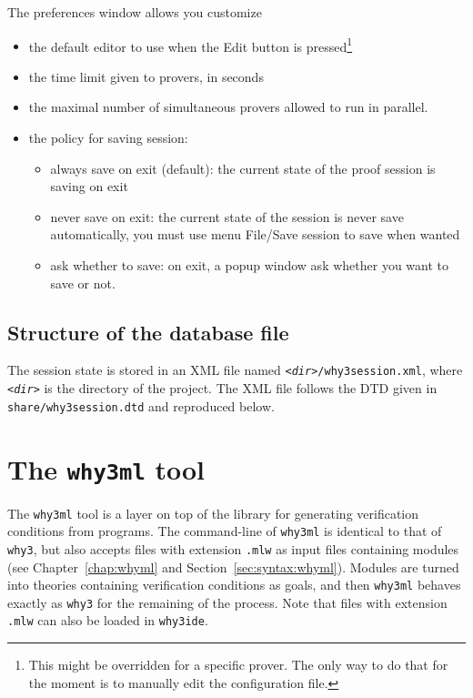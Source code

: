 The preferences window allows you customize
\begin{itemize}
\item the default editor to use when the \textsf{Edit} button is
  pressed\footnote{This might be overridden for a specific prover. The only way
  to do that for the moment is to manually edit the configuration file.}
\item the time limit given to provers, in seconds
\item the maximal number of simultaneous provers allowed to run in parallel.
\item the policy for saving session:
  \begin{itemize}
  \item always save on exit (default): the current state of the proof session is saving on exit
  \item never save on exit: the current state of the session is never save automatically, you must use menu \textsf{File/Save session} to save when wanted
  \item ask whether to save: on exit, a popup window ask whether you
    want to save or not.
  \end{itemize}
\end{itemize}

\subsection{Structure of the database file}

The session state is stored in an XML file named
\texttt{\textsl{<dir>}/why3session.xml}, where \texttt{\textsl{<dir>}}
is the directory of the project.
The XML file follows the DTD given in \texttt{share/why3session.dtd} and reproduced below.


\section{The \texttt{why3ml} tool}

The \texttt{why3ml} tool is a layer on  top of the \why library for
generating verification conditions from \whyml programs.
The command-line of \texttt{why3ml} is identical to that of
\texttt{why3}, but also accepts files with extension \texttt{.mlw} as
input files containing \whyml modules (see Chapter~\ref{chap:whyml}
and Section~\ref{sec:syntax:whyml}). Modules are turned into
theories containing verification conditions as goals, and then
\texttt{why3ml} behaves exactly as \texttt{why3} for the remaining of
the process.
Note that files with extension \texttt{.mlw} can also be loaded in
\texttt{why3ide}.

